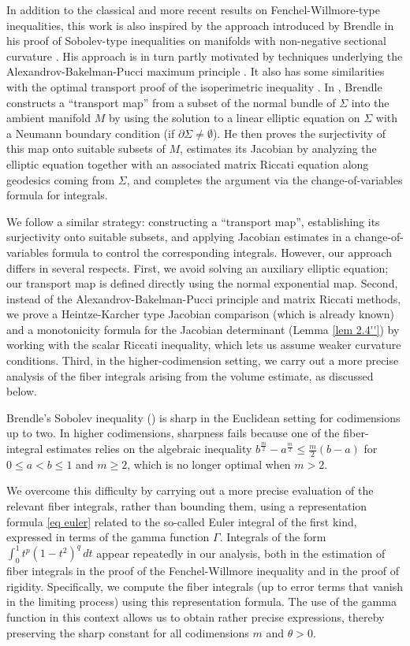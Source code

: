 \documentclass[11pt, reqno]{amsart}
\numberwithin{equation}{section}
\begin{document}
In addition to the classical and more recent results on Fenchel-Willmore-type inequalities, this work is also inspired by the approach introduced by Brendle in his proof of Sobolev-type inequalities on manifolds with non-negative sectional curvature \cite{Brendle2023}. His approach is in turn partly motivated by techniques underlying the Alexandrov-Bakelman-Pucci maximum principle \cite{cabre2008elliptic}. It also has some similarities with the optimal transport proof of the isoperimetric inequality \cite{BrendleEichmair2023}. In \cite[Theorem 1.4]{Brendle2023}, Brendle constructs a ``transport map'' from a subset of the normal bundle of $\Sigma$ into the ambient manifold $M$ by using the solution to a linear elliptic equation on $\Sigma$ with a Neumann boundary condition (if $\partial \Sigma\ne\emptyset$). He then proves the surjectivity of this map onto suitable subsets of $M$, estimates its Jacobian by analyzing the elliptic equation together with an associated matrix Riccati equation along geodesics coming from $\Sigma$, and completes the argument via the change-of-variables formula for integrals.

We follow a similar strategy: constructing a ``transport map'', establishing its surjectivity onto suitable subsets, and applying Jacobian estimates in a change-of-variables formula to control the corresponding integrals. However, our approach differs in several respects. First, we avoid solving an auxiliary elliptic equation; our transport map is defined directly using the normal exponential map. Second, instead of the Alexandrov-Bakelman-Pucci principle and matrix Riccati methods, we prove a Heintze-Karcher type Jacobian comparison (which is already known) and a monotonicity formula for the Jacobian determinant (Lemma \ref{lem 2.4''}) by working with the scalar Riccati inequality, which lets us assume weaker curvature conditions. Third, in the higher-codimension setting, we carry out a more precise analysis of the fiber integrals arising from the volume estimate, as discussed below.

Brendle's Sobolev inequality (\cite[Theorem 1.4]{Brendle2023}) is sharp in the Euclidean setting for codimensions up to two. In higher codimensions, sharpness fails because one of the fiber‐integral estimates relies on the algebraic inequality $b^{\frac{m}{2}}-a^{\frac{m}{2}} \le \frac{m}{2}(b-a)$ for $0 \le a< b \le 1$ and $m\ge2$, which is no longer optimal when $m>2$.

We overcome this difficulty by carrying out a more precise evaluation of the relevant fiber integrals, rather than bounding them, using a representation formula \eqref{eq euler} related to the so-called Euler integral of the first kind, expressed in terms of the gamma function $\Gamma$. Integrals of the form $\int_0^1 t^p (1 - t^2)^q \, dt$ appear repeatedly in our analysis, both in the estimation of fiber integrals in the proof of the Fenchel-Willmore inequality and in the proof of rigidity. Specifically, we compute the fiber integrals (up to error terms that vanish in the limiting process) using this representation formula. The use of the gamma function in this context allows us to obtain rather precise expressions, thereby preserving the sharp constant for all codimensions $m$ and $\theta > 0$.
\end{document}
